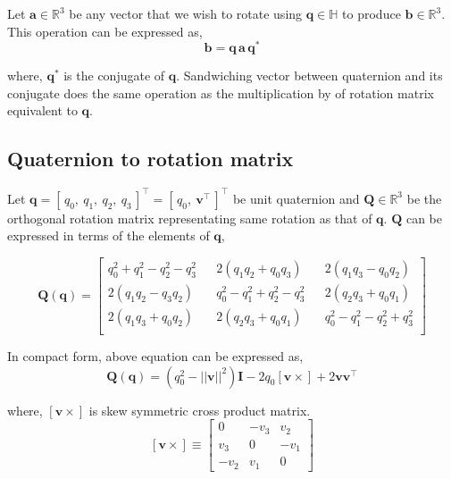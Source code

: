 \documentclass[12pt]{article}
\begin{document}
Let $\bm{a} \in \mathbb{R}^{3}$ be any vector that we wish to rotate using $\bm{q} \in \mathbb{H}$ to produce $\bm{b} \in \mathbb{R}^{3}$. This operation can be expressed as,
\begin{equation}
\bm{b} = \bm{q}\,\bm{a}\,\bm{q}^{*}
\end{equation}

where, $\bm{q}^{*}$ is the conjugate of $\bm{q}$. Sandwiching vector between quaternion and its conjugate does the same operation as the multiplication by of rotation matrix equivalent to $\bm{q}$. 

\subsection{Quaternion to rotation matrix}
Let $\bm{q} = [\, q_{0}, \: q_{1}, \: q_{2}, \: q_{3} \,]^{\intercal} = [\, q_{0}, \: \bm{v}^{\intercal} \,]^{\intercal}$ be unit quaternion and $\bm{Q} \in \mathbb{R}^{3}$ be the orthogonal rotation matrix representating same rotation as that of $\bm{q}$. $\bm{Q}$ can be expressed in terms of the elements of $\bm{q}$,

\begin{equation}
    \bm{Q}(\bm{q}) = 
    \begin{bmatrix}
        q_{0}^{2}+q_{1}^{2}-q_{2}^{2}-q_{3}^{2} && 2(q_{1}q_{2}+q_{0}q_{3}) && 2(q_{1}q_{3}-q_{0}q_{2}) \\
        2(q_{1}q_{2}-q_{3}q_{2}) && q_{0}^{2}-q_{1}^{2}+q_{2}^{2}-q_{3}^{2} && 2(q_{2}q_{3}+q_{0}q_{1}) \\
        2(q_{1}q_{3}+q_{0}q_{2}) && 2(q_{2}q_{3}+q_{0}q_{1}) && q_{0}^{2}-q_{1}^{2}-q_{2}^{2}+q_{3}^{2}\\
    \end{bmatrix}
    \label{eq_quat_to_rot}
\end{equation}   

In compact form, above equation can be expressed as,
\begin{equation}
\bm{Q}(\bm{q}) = (q_{0}^{2} - |\!| \bm{v}|\!|^{2}) \bm{I} - 2q_{0}[\bm{v} \times] + 2\bm{v}\bm{v}^{\intercal}
\end{equation}

where, $[\bm{v} \times]$ is skew symmetric cross product matrix.
$$
[\bm{v} \times] \equiv 
\begin{bmatrix} 
    0 & -v_{3} & v_{2} \\ v_{3} & 0 & -v_{1} \\ -v_{2} & v_{1} & 0 
\end{bmatrix} 
$$
\end{document}
